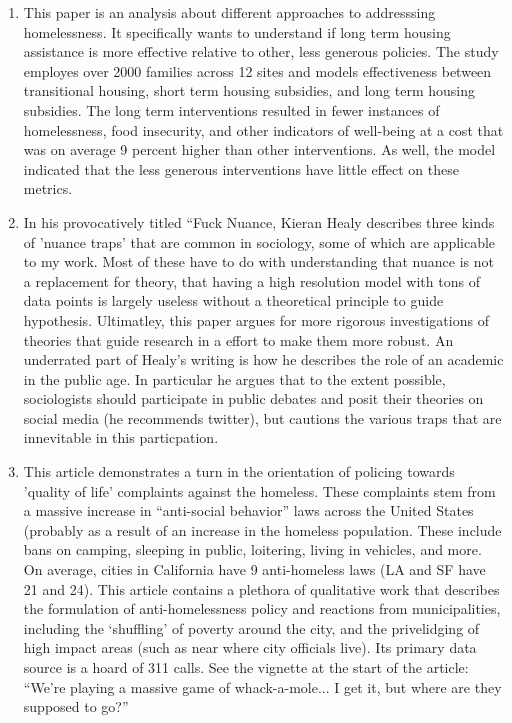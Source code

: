 \documentclass{article}
\begin{document}
\begin{enumerate}
\item \cite{gubits2018WhatInterventionsa} This paper is an analysis
  about different approaches to addresssing homelessness. It
  specifically wants to understand if long term housing assistance is
  more effective relative to other, less generous policies. The study
  employes over 2000 families across 12 sites and models effectiveness
  between transitional housing, short term housing subsidies, and long
  term housing subsidies. The long term interventions resulted in
  fewer instances of homelessness, food insecurity, and other
  indicators of well-being at a cost that was on average 9 percent
  higher than other interventions. As well, the model indicated that
  the less generous interventions have little effect on these metrics.

\item \cite{healy2017PublicSociology} In his provocatively titled
  ``Fuck Nuance, Kieran Healy describes three kinds of 'nuance traps'
  that are common in sociology, some of which are applicable to my
  work. Most of these have to do with understanding that nuance is not
  a replacement for theory, that having a high resolution model with
  tons of data points is largely useless without a theoretical
  principle to guide hypothesis. Ultimatley, this paper argues for
  more rigorous investigations of theories that guide research in a
  effort to make them more robust. An underrated part of Healy's
  writing is how he describes the role of an academic in the public
  age. In particular he argues that to the extent possible,
  sociologists should participate in public debates and posit their
  theories on social media (he recommends twitter), but cautions the
  various traps that are innevitable in this particpation.

  
\item \cite{herring2019ComplaintOrientedPolicinga} This article
  demonstrates a turn in the orientation of policing towards 'quality
  of life' complaints against the homeless. These complaints stem from
  a massive increase in ``anti-social behavior'' laws across the
  United States (probably as a result of an increase in the homeless
  population. These include bans on camping, sleeping in public,
  loitering, living in vehicles, and more. On average, cities in
  California have 9 anti-homeless laws (LA and SF have 21 and
  24). This article contains a plethora of qualitative work that
  describes the formulation of anti-homelessness policy and reactions
  from municipalities, including the `shuffling' of poverty around the
  city, and the privelidging of high impact areas (such as near where
  city officials live). Its primary data source is a hoard of 311
  calls. See the vignette at the start of the article: ``We're playing
  a massive game of whack-a-mole... I get it, but where are they
  supposed to go?''


\end{enumerate}
\end{document}
